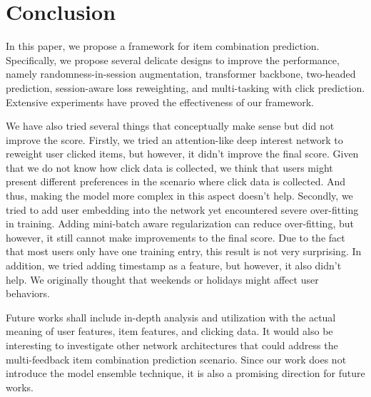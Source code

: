 \section{Conclusion} \label{sec:conclusion}


In this paper, we propose a framework for item combination prediction. Specifically, we propose several delicate designs to improve the performance, namely randomness-in-session augmentation, transformer backbone, two-headed prediction, session-aware loss reweighting, and multi-tasking with click prediction.
Extensive experiments have proved the effectiveness of our framework.

We have also tried several things that conceptually make sense but did not improve the score.
Firstly, we tried an attention-like deep interest network \cite{din} to reweight user clicked items, but however, it didn't improve the final score.
Given that we do not know how click data is collected, we think that users might present different preferences in the scenario where click data is collected. And thus, making the model more complex in this aspect doesn't help.
Secondly, we tried to add user embedding into the network yet encountered severe over-fitting in training. Adding mini-batch aware regularization \cite{din} can reduce over-fitting, but however, it still cannot make improvements to the final score.
Due to the fact that most users only have one training entry, this result is not very surprising.
In addition, we tried adding timestamp as a feature, but however, it also didn't help. We originally thought that weekends or holidays might affect user behaviors.



Future works shall include in-depth analysis and utilization with the actual meaning of user features, item features, and clicking data. It would also be interesting to investigate other network architectures that could address the multi-feedback item combination prediction scenario.
Since our work does not introduce the model ensemble technique, it is also a promising direction for future works.
